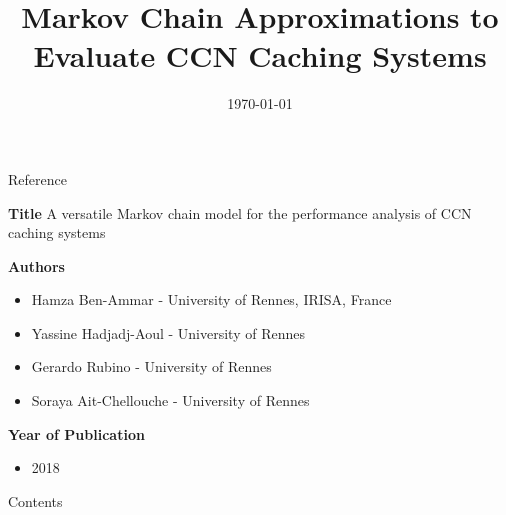 \documentclass[
	xcolor={svgnames},
	hyperref={pagebackref,bookmarks},
	aspectratio=43,
]{beamer}
\title[]{Markov Chain Approximations to Evaluate CCN Caching Systems}
\title{\presentationtitle}
\author{\presenter}
\institute[IITH]{
	\university\\
}
\date{\today}
\begin{document}

\newcommand{\brak}[1]{\ensuremath{\left( #1 \right)}}
\newcommand{\sbrak}[1]{\ensuremath{\left[ #1 \right]}}
\newcommand{\Exp}[1]{\ensuremath{\mathbb{E} \left[ #1 \right]}}
\newcommand{\Var}[1]{\ensuremath{\text{Var} \left[ #1 \right]}}

\begin{frame}
	\titlepage
\end{frame}


\begin{frame}{Reference}
    \begin{block}{\textbf{Title}}
        A versatile Markov chain model for the performance analysis of CCN caching systems
    \end{block}
    \begin{block}{\textbf{Authors}}
        \begin{itemize}
            \item Hamza Ben-Ammar - University of Rennes, IRISA, France
            \item Yassine Hadjadj-Aoul - University of Rennes
            \item Gerardo Rubino - University of Rennes
            \item Soraya Ait-Chellouche - University of Rennes
        \end{itemize}
    \end{block}
    \begin{block}{\textbf{Year of Publication}}
        \begin{itemize}
            \item 2018
        \end{itemize}
    \end{block}
\end{frame}

\begin{frame}{Contents}
	\tableofcontents
\end{frame}
\end{document}
